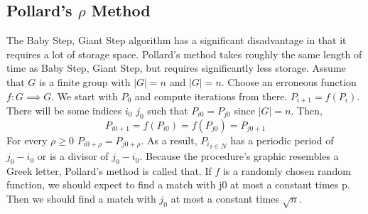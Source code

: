 \subsection{ Pollard's $\rho$ Method}
The Baby Step, Giant Step algorithm has a significant disadvantage in that it requires a lot of storage space. Pollard's method takes roughly the same length of time as Baby Step, Giant Step, but requires significantly less storage. Assume that $G$ is a finite group with $|G| = n$ and $|G| = n$. Choose an erroneous function $f: G \implies G$. We start with $P_{0}$ and compute iterations from there. $P_{i+1} = f(P_{i})$. There will be some indices $i_{0}$ $j_{0}$ such that $P_{i0} = P_{j0}$ since $|G| = n$. Then,
$$P_{i0+1}=f(P_{i0})=f(P_{j0})=P_{j0+1}$$
For every $ \rho \geq 0$ $P_{i0+ \rho} = P_{j0+ \rho}$. As a result, ${P_{i}}_{i \in N}$ has a periodic period of $j_{0}-i_{0}$ or is a divisor of $j_{0}-i_{0}$. Because the procedure's graphic resembles a Greek letter, Pollard's method is called that. If $f$ is a randomly chosen random function, we should expect to find a match with j0 at most a constant times p. Then we should find a match with $j_{0}$ at most a constant times $ \sqrt n$.

